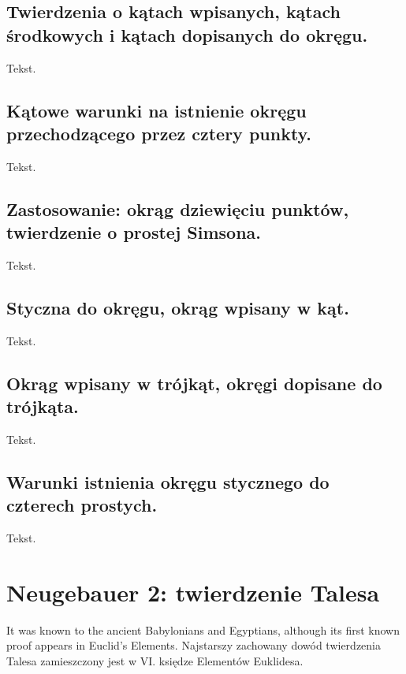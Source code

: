 \documentclass{parchment}
\begin{document}
\section{Twierdzenia o kątach wpisanych, kątach środkowych i kątach dopisanych do okręgu.}
Tekst.

\section{Kątowe warunki na istnienie okręgu przechodzącego przez cztery punkty.}
Tekst.

\section{Zastosowanie: okrąg dziewięciu punktów, twierdzenie o prostej Simsona.}
Tekst.

\section{Styczna do okręgu, okrąg wpisany w kąt.}
Tekst.

\section{Okrąg wpisany w trójkąt, okręgi dopisane do trójkąta.}
Tekst.

\section{Warunki istnienia okręgu stycznego do czterech prostych.}
Tekst.




\chapter{Neugebauer 2: twierdzenie Talesa}

It was known to the ancient Babylonians and Egyptians, although its first known proof appears in Euclid's Elements. 
Najstarszy zachowany dowód twierdzenia Talesa zamieszczony jest w VI. księdze Elementów Euklidesa. 





\end{document}
